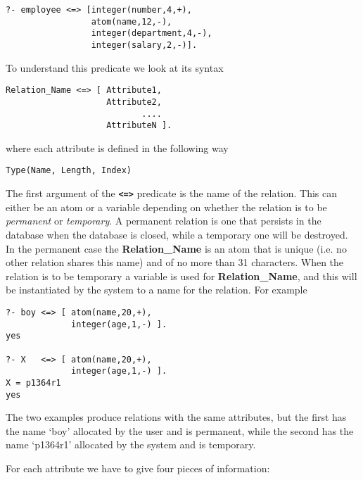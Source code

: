 \begin{verbatim}
?- employee <=> [integer(number,4,+),
                 atom(name,12,-),
                 integer(department,4,-),
                 integer(salary,2,-)].
\end{verbatim}
To understand this predicate we look at its syntax

\begin{verbatim}
Relation_Name <=> [ Attribute1,
                    Attribute2,
                           ....
                    AttributeN ].
\end{verbatim}

where each attribute is defined in the following way

\begin{verbatim}
Type(Name, Length, Index)
\end{verbatim}

The first argument of the {\bf \verb-<=>-} predicate is the name of the
relation.  This can either be an atom or a variable depending
on whether the relation is to be {\em permanent} or {\em temporary}.
 
A permanent relation is one that persists in the database when 
the database is closed, while a temporary one will be destroyed.
In the permanent case the {\bf Relation\_Name} is an atom that
is unique (i.e. no other relation shares this name) and of no more
than 31 characters. When the relation is to be temporary a variable is used
for {\bf Relation\_Name}, and this will be instantiated by the system 
to a name for the relation. For example
\begin{verbatim}
?- boy <=> [ atom(name,20,+),
             integer(age,1,-) ].
yes

?- X   <=> [ atom(name,20,+),
             integer(age,1,-) ].
X = p1364r1
yes
\end{verbatim}

The two examples produce relations with the same attributes, but
the first has the name `boy' allocated by the user and is permanent, while
the second has the name `p1364r1' allocated by the system and is temporary.


For each attribute we have to give four pieces of information:

